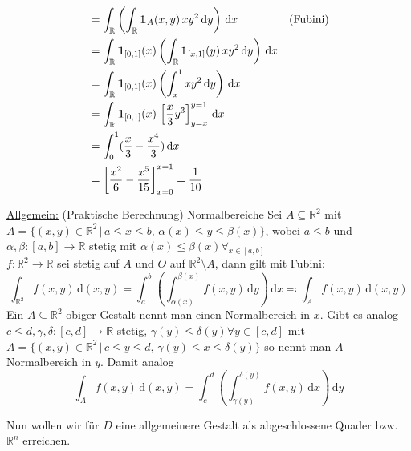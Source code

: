 \begin{itemize}
\begin{align*}
        &= \int_{\mathbb{R}} \left(\int_{\mathbb{R}} \id_A (x,y)\, xy^2 \, \text{d}y \right)\, \text{d}x & \text{(Fubini)} \\
        &= \int_{\mathbb{R}} \id_{[0,1]}(x) \left(\int_{\mathbb{R}} \id_{[x,1]}(y) \, xy^2 \, \text{d}y \right) \, \text{d}x & \\
        &= \int_{\mathbb{R}} \id_{[0,1]}(x) \left(\int_x^1 xy^2 \, \text{d}y \right) \,\text{d}x & \\
        &= \int_{\mathbb{R}} \id_{[0,1]}(x)\, \left[\frac{x}{3}y^3\right]_{y=x}^{y=1} \,\text{d}x & \\
        &= \int_0^1 (\frac{x}{3} - \frac{x^4}{3}) \,\text{d}x & \\
        &= \left[\frac{x^2}{6} - \frac{x^5}{15}\right]_{x=0}^{x=1} = \frac{1}{10} &
    \end{align*}
\end{itemize}
\underline{Allgemein:} (Praktische Berechnung) Normalbereiche
Sei $A \subseteq \mathbb{R}^2$ mit $A= \{(x,y) \in \mathbb{R}^2 \, | \, a \leq x \leq b, \, \alpha (x)\leq y \leq \beta (x)\}$, wobei $a\leq b$ und $\alpha ,\beta \colon [a,b] \to \mathbb{R}$ stetig mit $\alpha (x) \leq \beta (x) \forall_{x\in[a,b]}$\\
$f\colon \mathbb{R}^2 \to \mathbb{R}$ sei stetig auf $A$ und $O$ auf $\mathbb{R}^2\setminus A$, dann gilt mit Fubini:
\begin{equation*}
    \int_{\mathbb{R}^2} f(x,y) \,\text{d}(x,y) = \int_a^b \left(\int_{\alpha (x)}^{\beta (x)} f(x,y) \,\text{d}y\right)\,\text{d}x \eqqcolon \int_A f(x,y) \, \text{d}(x,y)
\end{equation*}
Ein $A \subseteq \mathbb{R}^2$ obiger Gestalt nennt man einen Normalbereich in $x$. Gibt es analog $c\leq d, \gamma, \delta\colon [c,d]\to \mathbb{R}$ stetig, $\gamma (y) \leq \delta (y)\forall y\in [c,d]$ mit $A=\{(x,y) \in\mathbb{R}^2\,|\,c\leq y\leq d,\,\gamma (y) \leq x\leq \delta (y)\}$ so nennt man $A$ Normalbereich in $y$. Damit analog
\begin{equation*}
    \int_A f(x,y) \,\text{d}(x,y) = \int_c^d \left(\int_{\gamma (y)}^{\delta(y)} f(x,y)\,\text{d}x\right)\,\text{d}y
\end{equation*}

Nun wollen wir für $D$ eine allgemeinere Gestalt als abgeschlossene Quader bzw. $\mathbb{R}^n$ erreichen.

